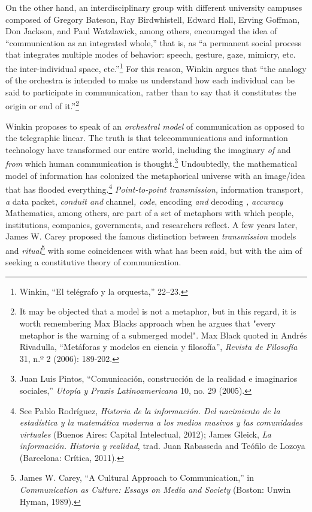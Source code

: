 \documentclass{tufte-handout}
\begin{document}
On the other hand, an interdisciplinary group with different university
campuses composed of Gregory Bateson, Ray Birdwhistell, Edward Hall,
Erving Goffman, Don Jackson, and Paul Watzlawick, among others,
encouraged the idea of ``communication as an integrated whole,'' that
is, as ``a permanent social process that integrates multiple modes of
behavior: speech, gesture, gaze, mimicry, etc. the inter-individual
space, etc.''\footnote{Winkin, ``El telégrafo y la orquesta,'' 22--23.}
For this reason, Winkin argues that ``the analogy of the orchestra is
intended to make us understand how each individual can be said to
participate in communication, rather than to say that it constitutes the
origin or end of it.''\footnote{It may be objected that a model is not a
  metaphor, but in this regard, it is worth remembering Max
  Black\textquotesingle s approach when he argues that "every metaphor
  is the warning of a submerged model". Max Black quoted in Andrés
  Rivadulla, ``Metáforas y modelos en ciencia y filosofía'',
  \emph{Revista de Filosofía} 31, n.º 2 (2006): 189-202.}

Winkin proposes to speak of an \emph{orchestral model} of communication
as opposed to the telegraphic linear. The truth is that
telecommunications and information technology have transformed our
entire world, including the imaginary \emph{of} and \emph{from} which
human communication is thought.\footnote{Juan Luis Pintos,
  ``Comunicación, construcción de la realidad e imaginarios sociales,''
  \emph{Utopía y Praxis Latinoamericana} 10, no. 29 (2005).}
Undoubtedly, the mathematical model of information has colonized the
metaphorical universe with an image/idea that has flooded
everything.\footnote{See Pablo Rodríguez, \emph{Historia de la
  información. Del nacimiento de la estadística y la matemática moderna
  a los medios masivos y las comunidades virtuales} (Buenos Aires:
  Capital Intelectual, 2012); James Gleick, \emph{La información.
  Historia y realidad}, trad. Juan Rabasseda and Teófilo de Lozoya
  (Barcelona: Crítica, 2011).} \emph{Point-to-point transmission,}
information transport\emph{, a} data packet, \emph{conduit and}
channel\emph{, code}, encoding \emph{and} decoding \emph{,}
\emph{accuracy} Mathematics, among others, are part of a set of
metaphors with which people, institutions, companies, governments, and
researchers reflect. A few years later, James W. Carey proposed the
famous distinction between \emph{transmission} models and
\emph{ritual}\footnote{James W. Carey, ``A Cultural Approach to
  Communication,'' in \emph{Communication as Culture: Essays on Media
  and Society} (Boston: Unwin Hyman, 1989).} with some coincidences with
what has been said, but with the aim of seeking a constitutive theory of
communication.
\end{document}
